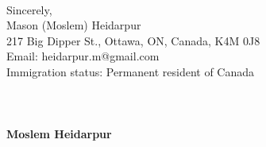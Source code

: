 \documentclass[12pt,oneside]{book}
\begin{document}
%
\vspace*{1\baselineskip}
\phantom \quad \\
Sincerely,\\[0.2cm]
Mason (Moslem) Heidarpur\\
217 Big Dipper St., Ottawa, ON, Canada, K4M 0J8\\
Email: heidarpur.m@gmail.com\\
Immigration status: Permanent resident of Canada\\[-0.1cm]
\newpage
\lhead{\textcolor{gray}{Curriculum vitae}}
\large \bf \hphantom \\ \\ \\
 {\selectfont Moslem Heidarpur} \mdseries \normalsize \\ \\ 
\end{document}
